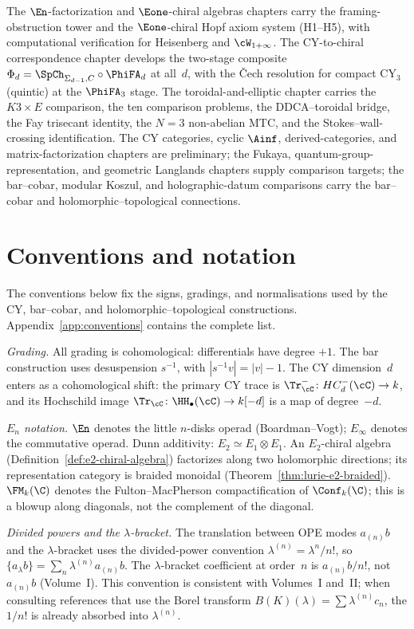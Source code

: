 The $\En$-factorization and $\Eone$-chiral algebras chapters
carry the framing-obstruction tower and the $\Eone$-chiral
Hopf axiom system (H1--H5), with computational verification
for Heisenberg and $\cW_{1+\infty}$. The CY-to-chiral
correspondence chapter develops the two-stage composite
$\Phi_d = \SpCh_{\Sigma_{d-1}, C}\circ\PhiFA_d$ at all~$d$,
with the \v{C}ech resolution for compact CY$_3$ (quintic) at
the $\PhiFA_3$ stage. The toroidal-and-elliptic chapter
carries the \(K3 \times E\) comparison, the ten comparison problems,
the DDCA--toroidal bridge, the Fay
trisecant identity, the $N = 3$ non-abelian MTC, and the
Stokes--wall-crossing identification. The CY categories,
cyclic $\Ainf$, derived-categories, and matrix-factorization
chapters are preliminary; the Fukaya,
quantum-group-representation, and geometric Langlands
chapters supply comparison targets; the bar--cobar, modular Koszul, and
holographic-datum comparisons carry the bar--cobar and
holomorphic--topological connections.

\section{Conventions and notation}
\label{sec:conventions-intro}

The conventions below fix the signs, gradings, and normalisations used
by the CY, bar--cobar, and holomorphic--topological constructions.
Appendix~\ref{app:conventions} contains the complete list.

\emph{Grading.} All grading is cohomological: differentials
have degree $+1$. The bar construction uses desuspension
$s^{-1}$, with $|s^{-1}v| = |v| - 1$. The CY dimension~$d$ enters
as a cohomological shift: the primary CY trace is
\(\Tr^-_\cC\colon HC^-_d(\cC)\to k\), and its Hochschild image
\(\Tr_\cC\colon \HH_\bullet(\cC)\to k[-d]\) is a map of
degree~$-d$.

\emph{$E_n$ notation.} $\En$ denotes the little $n$-disks
operad (Boardman--Vogt); $E_\infty$ denotes the commutative
operad. Dunn additivity: $E_2 \simeq E_1 \otimes E_1$. An
$E_2$-chiral algebra (Definition~\ref{def:e2-chiral-algebra})
factorizes along two holomorphic directions; its
representation category is braided monoidal
(Theorem~\ref{thm:lurie-e2-braided}). $\FM_k(\C)$ denotes the
Fulton--MacPherson compactification of $\Conf_k(\C)$; this is
a blowup along diagonals, not the complement of the diagonal.

\emph{Divided powers and the $\lambda$-bracket.} The
translation between OPE modes $a_{(n)} b$ and the
$\lambda$-bracket uses the divided-power convention
$\lambda^{(n)} = \lambda^n / n!$, so
$\{a_\lambda b\} = \sum_n \lambda^{(n)} a_{(n)} b$. The
$\lambda$-bracket coefficient at order~$n$ is
$a_{(n)} b / n!$, not $a_{(n)} b$ (Volume~I). This convention
is consistent with Volumes~I and~II; when consulting
references that use the Borel transform
$B(K)(\lambda) = \sum \lambda^{(n)} c_n$, the $1/n!$ is
already absorbed into $\lambda^{(n)}$.

